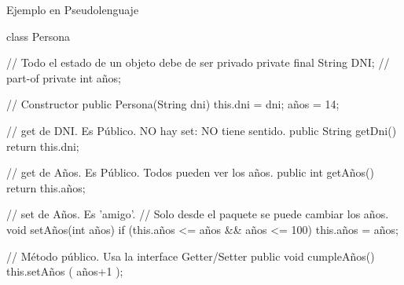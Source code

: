 \documentclass[10pt,envcountsect,spanish]{beamer}
\begin{document}




\begin{frame}[fragile]{Ejemplo en Pseudolenguaje}
\tiny
\begin{code}[fontsize=\tiny]%
class Persona {
   // Todo el estado de un objeto debe de ser privado
   private final String DNI; // part-of
   private int años;
   
   // Constructor
   public Persona(String dni) { this.dni = dni; años = 14; }   
   
   // get de DNI. Es Público. NO hay set: NO tiene sentido.
   public String getDni() {  return this.dni; }
   
   // get de Años. Es Público. Todos pueden ver los años.
   public  int  getAños() { return this.años; }
   
   // set de Años. Es 'amigo'. 
   // Solo desde el paquete se puede cambiar los años.
   void setAños(int años) { 
       if (this.años <= años && años <= 100) this.años = años; 
   }
   
   // Método público. Usa la interface Getter/Setter
   public void cumpleAños() { this.setAños ( años+1 ); }
}
\end{code}
\end{frame}
\end{document}
